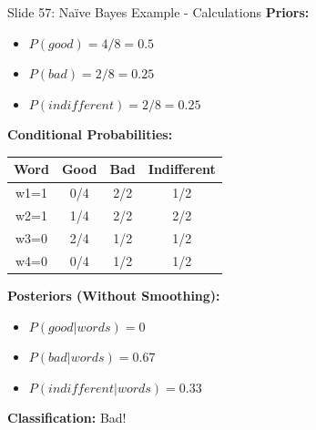 \documentclass[8pt]{beamer}
\begin{document}
	\begin{frame}{Slide 57: Naïve Bayes Example - Calculations}
		\fontsize{6.5}{7.5}\selectfont
		\textbf{Priors:}
		\begin{itemize}
			\item $P(good) = 4/8 = 0.5$
			\item $P(bad) = 2/8 = 0.25$
			\item $P(indifferent) = 2/8 = 0.25$
		\end{itemize}
		
		\vspace{0.1cm}
		\textbf{Conditional Probabilities:}
		\begin{tabular}{|c|c|c|c|}
			\hline
			Word & Good & Bad & Indifferent \\
			\hline
			w1=1 & 0/4 & 2/2 & 1/2 \\
			w2=1 & 1/4 & 2/2 & 2/2 \\
			w3=0 & 2/4 & 1/2 & 1/2 \\
			w4=0 & 0/4 & 1/2 & 1/2 \\
			\hline
		\end{tabular}
		
		\vspace{0.1cm}
		\textbf{Posteriors (Without Smoothing):}
		\begin{itemize}
			\item $P(good|words) = 0$
			\item $P(bad|words) = 0.67$
			\item $P(indifferent|words) = 0.33$
		\end{itemize}
		
		\textcolor{myblue}{\textbf{Classification:}} Bad!
	\end{frame}
	
\end{document}
